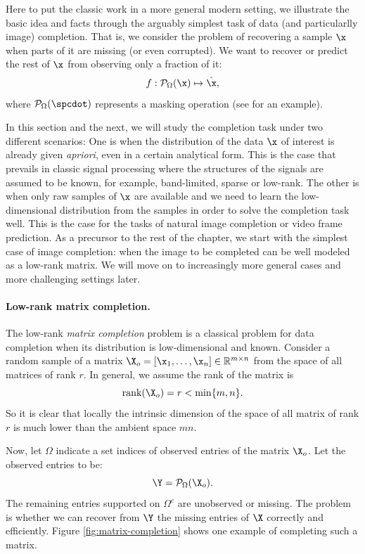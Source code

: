 \documentclass[../../book-main.tex]{subfiles}
\begin{document}
Here to put the classic work in a more general modern setting, we illustrate the basic idea and facts through the arguably simplest task of data (and particularlly image)  completion. That is, we consider the problem of recovering a sample $\x$ when parts of it are missing (or even corrupted). We want to recover or predict the rest of $\x$
from observing only a fraction of it:
\begin{equation}
f: \mathcal{P}_{\Omega}(\x) \mapsto \hat{\x},
\end{equation}
where $\mathcal{P}_{\Omega}(\spcdot)$ represents a masking operation
(see  for an example).

In this section and the next, we will study the completion task under two different scenarios: One is when the distribution of the data $\x$ of interest is already given {\em apriori}, even in a certain analytical form. This is the case that prevails in classic signal processing where the structures of the signals are assumed to be known, for example,  band-limited, sparse or low-rank. The other is when only raw samples of $\x$ are available and we need to learn the low-dimensional distribution from the samples in order to solve the completion task well. This is the case for the tasks of natural image completion or video frame prediction. As a precursor to the rest of the chapter, we start with the simplest case of image completion: when the image to be completed can be well modeled as a low-rank matrix. We will move on to increasingly more general cases and more challenging settings later.

\paragraph{Low-rank matrix completion.}  
The low-rank {\em matrix
completion} problem is a classical problem for data completion when its distribution is low-dimensional and known. Consider a  random sample of a matrix $\X_o =
[\x_1, \ldots, \x_n] \in \mathbb{R}^{m\times n}$ from the space of all matrices of rank $r$. In general, we assume the rank
of the matrix is
\begin{equation}
\mbox{rank}(\X_o) = r < \min\{m, n\}.
\end{equation}
So it is clear that locally the intrinsic dimension of the space of all matrix of rank $r$ is much lower than the ambient space $mn$.

Now, let $\Omega$ indicate a set indices of observed entries of the matrix $\X_o$. Let the observed entries to be:
\begin{equation}
\Y = \mathcal{P}_{\Omega}(\X_o).
\end{equation}
The remaining entries supported on $\Omega^c$ are unobserved or
missing. The problem is whether we can recover from $\Y$ the missing
entries of $\X$ correctly and efficiently.  Figure \ref{fig:matrix-completion} shows one
example of completing such a matrix.
\end{document}
